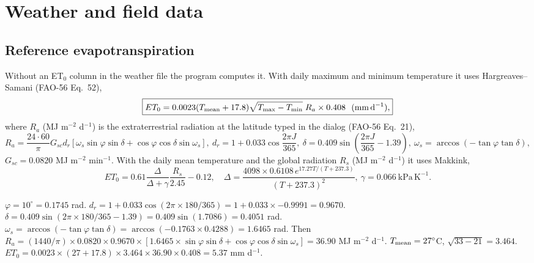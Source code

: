 \chapter{Weather and field data}\label{ch:weather}

\section{Reference evapotranspiration}
Without an ET$_0$ column in the weather file the program computes it. With daily maximum and minimum temperature it uses Hargreaves--Samani (FAO-56 Eq.~52),
\begin{equation}\boxed{ET_0=0.0023(T_{\rm mean}+17.8)\sqrt{T_{\max}-T_{\min}}\;R_a\times0.408\ \ (\mathrm{mm\,d^{-1}}),}\end{equation}
where $R_a$ (MJ m$^{-2}$ d$^{-1}$) is the extraterrestrial radiation at the latitude typed in the dialog (FAO-56 Eq.~21),
\begin{equation}R_a=\frac{24\cdot60}{\pi}G_{sc}d_r\left[\omega_s\sin\varphi\sin\delta+\cos\varphi\cos\delta\sin\omega_s\right],\ d_r=1+0.033\cos\frac{2\pi J}{365},\ \delta=0.409\sin\left(\frac{2\pi J}{365}-1.39\right),\ \omega_s=\arccos(-\tan\varphi\tan\delta),\end{equation}
$G_{sc}=0.0820$ MJ m$^{-2}$ min$^{-1}$. With the daily mean temperature and the global radiation $R_s$ (MJ m$^{-2}$ d$^{-1}$) it uses Makkink,
\begin{equation}\boxed{ET_0=0.61\frac{\Delta}{\Delta+\gamma}\frac{R_s}{2.45}-0.12,\quad\Delta=\frac{4098\times0.6108\,e^{17.27T/(T+237.3)}}{(T+237.3)^2},\ \gamma=0.066\ \mathrm{kPa\,K^{-1}}.}\end{equation}

\sol  $\varphi=10^\circ=0.1745$ rad. $d_r=1+0.033\cos(2\pi\times180/365)=1+0.033\times-0.9991=0.9670$. $\delta=0.409\sin(2\pi\times180/365-1.39)=0.409\sin(1.7086)=0.4051$ rad. $\omega_s=\arccos(-\tan\varphi\tan\delta)=\arccos(-0.1763\times0.4288)=1.6465$ rad. Then $R_a=(1440/\pi)\times0.0820\times0.9670\times[1.6465\times\sin\varphi\sin\delta+\cos\varphi\cos\delta\sin\omega_s]=36.90$ MJ m$^{-2}$ d$^{-1}$. $T_{\rm mean}=27^\circ$C, $\sqrt{33-21}=3.464$. $ET_0=0.0023\times(27+17.8)\times3.464\times36.90\times0.408=5.37$ mm d$^{-1}$.


